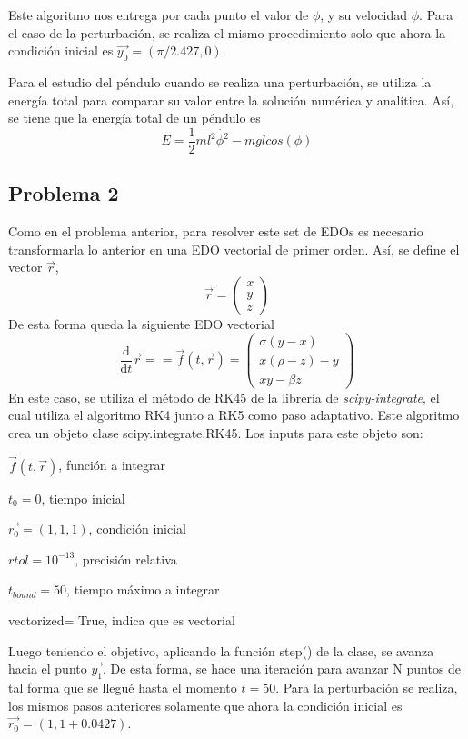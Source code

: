 \documentclass[letterpaper,oneside]{article}
\begin{document}
Este algoritmo nos entrega por cada punto el valor de $\phi$, y su velocidad $\dot{\phi}$. Para el caso de la perturbación, se realiza el mismo procedimiento solo que ahora la condición inicial es $\vec{y_0}=(\pi/2.427, 0)$.

Para el estudio del péndulo cuando se realiza una perturbación, se utiliza la energía total para comparar su valor entre la solución numérica y analítica. Así, se tiene que la energía total de un péndulo es
$$E=\frac{1}{2}ml^2\dot{\phi^2}-mglcos(\phi)$$
\subsection{Problema 2}
Como en el problema anterior, para resolver este set de EDOs es necesario transformarla lo anterior en una EDO vectorial de primer orden. Así, se define el vector $\vec{r}$, 
$$\vec{r}=\begin{pmatrix}
x\\ 
y\\ 
z
\end{pmatrix} $$
De esta forma queda la siguiente EDO vectorial
$$ \frac{\mathrm{d} }{\mathrm{d} t}\vec{r}==\vec{f}(t,\vec{r})=\begin{pmatrix}
\sigma (y-x)\\ 
x(\rho-z)-y\\ 
xy-\beta z
\end{pmatrix}$$
En este caso, se utiliza el método de RK45 de la librería de \textit{scipy-integrate}, el cual utiliza el algoritmo RK4 junto a RK5 como paso adaptativo. Este algoritmo crea un objeto clase scipy.integrate.RK45. Los inputs para este objeto son:
\begin{itemize}
\begin{multicols}{2}
    \item $\vec{f}(t,\vec{r})$, función a integrar
    \item $t_0=0$, tiempo inicial
    \item $\vec{r_0}=(1,1,1)$, condición inicial
    \item $rtol=10^{-13}$, precisión relativa
    \item $t_{bound} = 50$, tiempo máximo a integrar
    \item vectorized= True, indica que  es vectorial
\end{multicols}
\end{itemize}
Luego teniendo el objetivo, aplicando la función step() de la clase, se avanza hacia el punto $\vec{y_1}$. De esta forma, se hace una iteración para avanzar N puntos de tal forma que se llegué hasta el momento $t=50$. Para la perturbación se realiza, los mismos pasos anteriores solamente que ahora la condición inicial es $\vec{r_0}=(1,1+0.0427)$.
\end{document}
